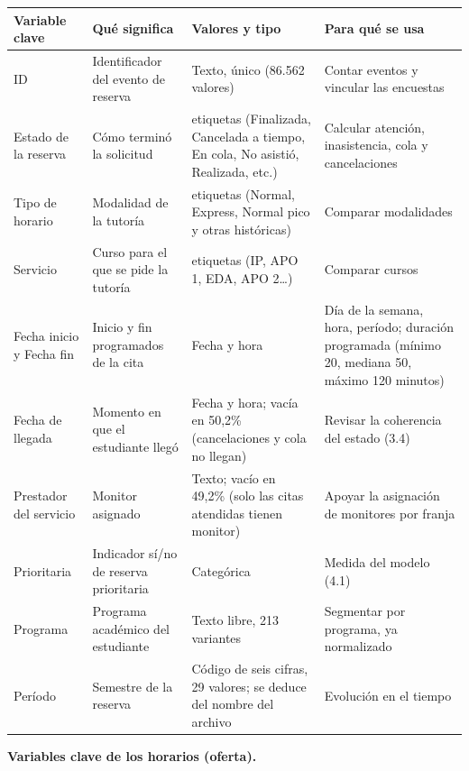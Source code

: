 \documentclass[11pt,letterpaper]{article}
\begin{document}
\begingroup\small\setlength{\tabcolsep}{4pt}\renewcommand{\arraystretch}{1.15}
\begin{longtable}{>{\raggedright\arraybackslash}p{}>{\raggedright\arraybackslash}p{}>{\raggedright\arraybackslash}p{}>{\raggedright\arraybackslash}p{}}
\toprule
\textbf{Variable clave} & \textbf{Qué significa} & \textbf{Valores y tipo} & \textbf{Para qué se usa} \\
\midrule
\endhead
ID & Identificador del evento de reserva & Texto, único (86.562 valores) & Contar eventos y vincular las encuestas \\
Estado de la reserva & Cómo terminó la solicitud & 12 etiquetas (Finalizada, Cancelada a tiempo, En cola, No asistió, Realizada, etc.) & Calcular atención, inasistencia, cola y cancelaciones \\
Tipo de horario & Modalidad de la tutoría & 10 etiquetas (Normal, Express, Normal pico y otras históricas) & Comparar modalidades \\
Servicio & Curso para el que se pide la tutoría & 11 etiquetas (IP, APO 1, EDA, APO 2\ldots{}) & Comparar cursos \\
Fecha inicio y Fecha fin & Inicio y fin programados de la cita & Fecha y hora & Día de la semana, hora, período; duración programada (mínimo 20, mediana 50, máximo 120 minutos) \\
Fecha de llegada & Momento en que el estudiante llegó & Fecha y hora; vacía en 50,2\% (cancelaciones y cola no llegan) & Revisar la coherencia del estado (3.4) \\
Prestador del servicio & Monitor asignado & Texto; vacío en 49,2\% (solo las citas atendidas tienen monitor) & Apoyar la asignación de monitores por franja \\
Prioritaria & Indicador sí/no de reserva prioritaria & Categórica & Medida del modelo (4.1) \\
Programa & Programa académico del estudiante & Texto libre, 213 variantes & Segmentar por programa, ya normalizado \\
Período & Semestre de la reserva & Código de seis cifras, 29 valores; se deduce del nombre del archivo & Evolución en el tiempo \\
\bottomrule
\end{longtable}
\endgroup


\textbf{Variables clave de los horarios (oferta).}
\end{document}
